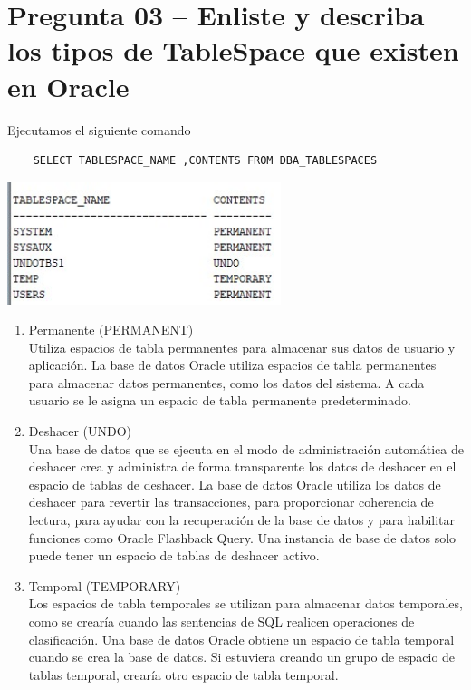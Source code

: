 \section{Pregunta 03 – Enliste y describa los tipos de TableSpace que existen en Oracle}
Ejecutamos el siguiente comando
\begin{verbatim}
    SELECT TABLESPACE_NAME ,CONTENTS FROM DBA_TABLESPACES
\end{verbatim}

\includegraphics[width=8cm]{./images/tablespace}


\begin{enumerate}
    \item Permanente (PERMANENT) \\
Utiliza espacios de tabla permanentes para almacenar sus datos de usuario y aplicación. La base de datos Oracle utiliza espacios de tabla permanentes para almacenar datos permanentes, como los datos del sistema. A cada usuario se le asigna un espacio de tabla permanente predeterminado.

\item Deshacer (UNDO)\\

Una base de datos que se ejecuta en el modo de administración automática de deshacer crea y administra de forma transparente los datos de deshacer en el espacio de tablas de deshacer. La base de datos Oracle utiliza los datos de deshacer para revertir las transacciones, para proporcionar coherencia de lectura, para ayudar con la recuperación de la base de datos y para habilitar funciones como Oracle Flashback Query. Una instancia de base de datos solo puede tener un espacio de tablas de deshacer activo.

\item Temporal (TEMPORARY)\\

Los espacios de tabla temporales se utilizan para almacenar datos temporales, como se crearía cuando las sentencias de SQL realicen operaciones de clasificación. Una base de datos Oracle obtiene un espacio de tabla temporal cuando se crea la base de datos. Si estuviera creando un grupo de espacio de tablas temporal, crearía otro espacio de tabla temporal.
\end{enumerate}
